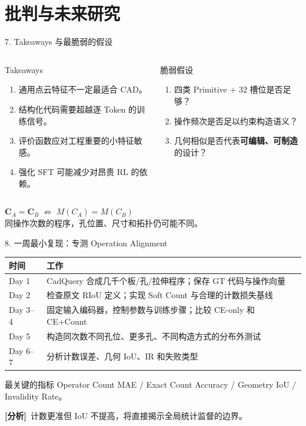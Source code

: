 \documentclass[aspectratio=169,11pt]{beamer}
\newcommand{\taginfer}{\textcolor{warn}{\bfseries [分析]}}
\newcommand{\tight}{\setlength{\itemsep}{0.24em}}
\begin{document}
\section{批判与未来研究}
\begin{frame}{7. Takeaways 与最脆弱的假设}
\small
\begin{columns}[T]
\begin{block}{Takeaways}
\begin{enumerate}\tight
\item 通用点云特征不一定最适合 CAD。
\item 结构化代码需要超越逐 Token 的训练信号。
\item 评价函数应对工程重要的小特征敏感。
\item 强化 SFT 可能减少对昂贵 RL 的依赖。
\end{enumerate}
\end{block}
\begin{block}{脆弱假设}
\begin{enumerate}\tight
\item 四类 Primitive + 32 槽位是否足够？
\item 操作频次是否足以约束构造语义？
\item 几何相似是否代表\textbf{可编辑、可制造}的设计？
\end{enumerate}
\end{block}
\end{columns}
\vspace{0.65em}
\centering
$\bm C_A=\bm C_B\;\not\Rightarrow\;M(C_A)=M(C_B)$\\[0.3em]
\small 同操作次数的程序，孔位置、尺寸和拓扑仍可能不同。
\end{frame}

\begin{frame}{8. 一周最小复现：专测 Operation Alignment}
\small
\begin{table}\centering
\begin{tabular}{lp{10.3cm}}\toprule
时间 & 工作\\\midrule
Day 1 & CadQuery 合成几千个板/孔/拉伸程序；保存 GT 代码与操作向量\\
Day 2 & 检查原文 RIoU 定义；实现 Soft Count 与合理的计数损失基线\\
Day 3–4 & 固定输入编码器，控制参数与训练步骤；比较 CE-only 和 CE+Count\\
Day 5 & 构造同次数不同孔位、更多孔、不同构造方式的分布外测试\\
Day 6–7 & 分析计数误差、几何 IoU、IR 和失败类型\\\bottomrule
\end{tabular}
\end{table}
\begin{block}{最关键的指标}
Operator Count MAE / Exact Count Accuracy / Geometry IoU / Invalidity Rate。
\end{block}
\taginfer\ 计数更准但 IoU 不提高，将直接揭示全局统计监督的边界。
\end{frame}
\end{document}
